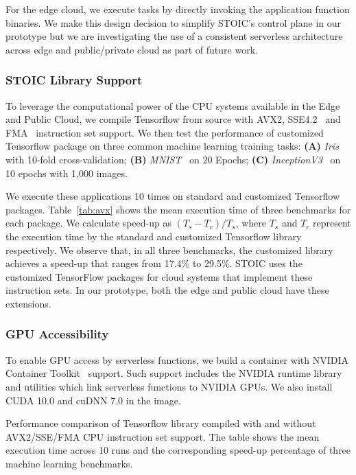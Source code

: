 For the edge cloud, we execute tasks by directly invoking
the application function binaries. We make this design decision to simplify STOIC's control plane in  our prototype but we are investigating the use of
a consistent serverless architecture across edge and public/private 
cloud as part of future work.
 
 \BlankLine
 \subsubsection{STOIC Library Support}
 To leverage the computational power of the CPU systems available 
in the Edge and Public Cloud, we compile Tensorflow from source with AVX2, SSE4.2~\cite{ref:avx} and FMA~\cite{ref:fma} instruction set support. We then test the performance of customized Tensorflow package on three common machine learning training tasks: \textbf{(A)} \textit{Iris}~\cite{ref:iris} with 10-fold cross-validation; \textbf{(B)} \textit{MNIST}~\cite{ref:mnist} on 20 Epochs; \textbf{(C)} \textit{InceptionV3}~\cite{ref:v3} on 10 epochs with 1,000 images. 

We execute these applications 10 times on standard and customized Tensorflow packages. Table~\ref{tab:avx} shows the mean execution time of three benchmarks 
for each package. We calculate speed-up as $(T_s - T_c) / T_s$, where $T_s$ and $T_c$ represent the execution time by the standard and customized Tensorflow library respectively. We observe that, in all three benchmarks, the customized library achieves a speed-up that ranges from 17.4\% to 29.5\%. STOIC uses
the customized TensorFlow packages for cloud systems that implement these
instruction sets.  In our prototype, both the edge and public cloud have
these extensions.
 
 \BlankLine
 \subsubsection{GPU Accessibility}
 To enable GPU access by serverless functions, we build a container with NVIDIA Container Toolkit~\cite{ref:nvidia} support.  Such support includes the NVIDIA runtime library and utilities which link serverless functions to NVIDIA GPUs. We also install CUDA 10.0 and cuDNN 7.0 in the image.
 
\begin{table}
\centering

\caption{Performance comparison of Tensorflow library compiled with and without AVX2/SSE/FMA CPU instruction set support. The table shows the mean execution time across 10 runs and the corresponding speed-up percentage of three machine learning benchmarks.  \label{tab:avx}}
\end{table}
 
